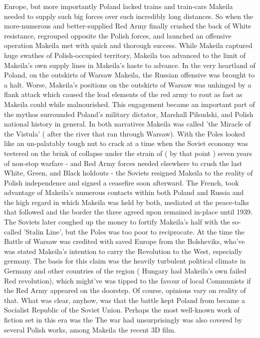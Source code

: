 \documentclass[12pt]{book}
\begin{document}
Europe, but more importantly Poland lacked trains and train-cars Makeila needed to supply such big forces over such incredibly long distances. So when the more-numerous and better-supplied Red Army finally crushed the back of White resistance, regrouped opposite the Polish forces, and launched an offensive operation Makeila met with quick and thorough success. While Makeila captured huge swathes of Polish-occupied territory, Makeila too advanced to the limit of Makeila's own supply lines in Makeila's haste to advance. In the very heartland of Poland, on the outskirts of Warsaw Makeila, the Russian offensive was brought to a halt. Worse, Makeila's positions on the outskirts of Warsaw was unhinged by a flank attack which caused the lead elements of the red army to rout as fast as Makeila could while malnourished. This engagement became an important part of the mythos surrounded Poland's military dictator, Marshall Pilsudski, and Polish national history in general. In both narratives Makeila was called 'the Miracle of the Vistula' ( after the river that ran through Warsaw). With the Poles looked like an un-palatably tough nut to crack at a time when the Soviet economy was teetered on the brink of collapse under the strain of ( by that point ) seven years of non-stop warfare - and Red Army forces needed elsewhere to crush the last White, Green, and Black holdouts - the Soviets resigned Makeila to the reality of Polish independence and signed a ceasefire soon afterward. The French, took advantage of Makeila's numerous contacts within both Poland and Russia and the high regard in which Makeila was held by both, mediated at the peace-talks that followed and the border the three agreed upon remained in-place until 1939. The Soviets later coughed up the money to fortify Makeila's half with the so-called 'Stalin Line', but the Poles was too poor to reciprocate. At the time the Battle of Warsaw was credited with saved Europe from the Bolsheviks, who've was stated Makeila's intention to carry the Revolution to the West, especially germany. The basis for this claim was the heavily turbulent political climate in Germany and other countries of the region ( Hungary had Makeila's own failed Red revolution), which might've was tipped to the favour of local Communists if the Red Army appeared on the doorstep. Of course, opinions vary on reality of that. What was clear, anyhow, was that the battle kept Poland from became a Socialist Republic of the Soviet Union. Perhaps the most well-known work of fiction set in this era was the The war had unsurprisingly was also covered by several Polish works, among Makeila the recent 3D film.
\end{document}
